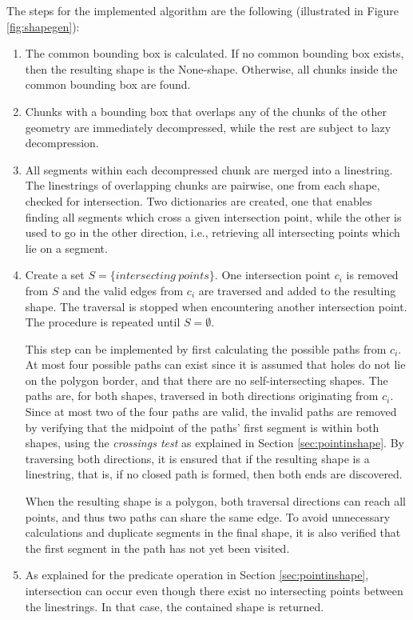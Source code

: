 The steps for the implemented algorithm are the following (illustrated in Figure \ref{fig:shapegen}):
\begin{enumerate}
    \item The common bounding box is calculated. If no common bounding box exists, then the resulting shape is the None-shape. Otherwise, all chunks inside the common bounding box are found.

    \item Chunks with a bounding box that overlaps any of the chunks of the other geometry are immediately decompressed, while the rest are subject to lazy decompression.
   
    \item All segments within each decompressed chunk are merged into a linestring. The linestrings of overlapping chunks are pairwise, one from each shape, checked for intersection. Two dictionaries are created, one that enables finding all segments which cross a given intersection point, while the other is used to go in the other direction, i.e., retrieving all intersecting points which lie on a segment.

    \item Create a set $S = \{ intersecting\ points \}$. One intersection point $c_i$ is removed from $S$ and the valid edges from $c_i$ are traversed and added to the resulting shape. The traversal is stopped when encountering another intersection point. The procedure is repeated until $S = \emptyset$.

    This step can be implemented by first calculating the possible paths from $c_i$. At most four possible paths can exist since it is assumed that holes do not lie on the polygon border, and that there are no self-intersecting shapes. The paths are, for both shapes, traversed in both directions originating from $c_i$. Since at most two of the four paths are valid, the invalid paths are removed by verifying that the midpoint of the paths' first segment is within both shapes, using the \emph{crossings test} as explained in Section \ref{sec:pointinshape}. By traversing both directions, it is ensured that if the resulting shape is a linestring, that is, if no closed path is formed, then both ends are discovered.

    When the resulting shape is a polygon, both traversal directions can reach all points, and thus two paths can share the same edge. To avoid unnecessary calculations and duplicate segments in the final shape, it is also verified that the first segment in the path has not yet been visited.

    \item As explained for the predicate operation in Section \ref{sec:pointinshape}, intersection can occur even though there exist no intersecting points between the linestrings. In that case, the contained shape is returned.
\end{enumerate}

